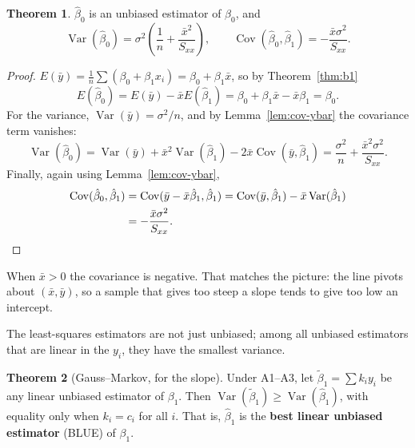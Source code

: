 \documentclass[11pt,a4paper]{article}
\numberwithin{equation}{section}
\theoremstyle{definition}
\newtheorem{thm}{Theorem}[subsection]
\begin{document}
\begin{thm}\label{thm:b0}
$\hat\beta_0$ is an unbiased estimator of $\beta_0$, and
\[
\operatorname{Var}(\hat\beta_0) = \sigma^2 \left( \frac1n + \frac{\bar x^2}{S_{xx}} \right),
\qquad
\operatorname{Cov}(\hat\beta_0, \hat\beta_1) = -\frac{\bar x \sigma^2}{S_{xx}} .
\]
\end{thm}

\begin{proof}
$E(\bar y) = \frac1n \sum (\beta_0 + \beta_1 x_i) = \beta_0 + \beta_1 \bar x$, so by
Theorem~\ref{thm:b1}
\[
E(\hat\beta_0) = E(\bar y) - \bar x E(\hat\beta_1) = \beta_0 + \beta_1 \bar x - \bar x \beta_1 = \beta_0 .
\]
For the variance, $\operatorname{Var}(\bar y) = \sigma^2/n$, and by Lemma~\ref{lem:cov-ybar}
the covariance term vanishes:
\[
\operatorname{Var}(\hat\beta_0) = \operatorname{Var}(\bar y) + \bar x^2 \operatorname{Var}(\hat\beta_1)
- 2\bar x \operatorname{Cov}(\bar y, \hat\beta_1)
= \frac{\sigma^2}{n} + \frac{\bar x^2 \sigma^2}{S_{xx}} .
\]
Finally, again using Lemma~\ref{lem:cov-ybar},
\begin{align*}
\operatorname{Cov}(\hat\beta_0, \hat\beta_1) &= \operatorname{Cov}(\bar y - \bar x \hat\beta_1, \hat\beta_1)
  = \operatorname{Cov}(\bar y, \hat\beta_1) - \bar x \operatorname{Var}(\hat\beta_1) \\
  &= -\frac{\bar x \sigma^2}{S_{xx}} . \qedhere
\end{align*}
\end{proof}

When $\bar x > 0$ the covariance is negative. That matches the picture: the line pivots about
$(\bar x, \bar y)$, so a sample that gives too steep a slope tends to give too low an
intercept.

The least-squares estimators are not just unbiased; among all unbiased estimators that are
linear in the $y_i$, they have the smallest variance.

\begin{thm}[Gauss--Markov, for the slope]\label{thm:gauss-markov}
Under A1--A3, let $\tilde\beta_1 = \sum k_i y_i$ be any linear unbiased estimator of
$\beta_1$. Then $\operatorname{Var}(\tilde\beta_1) \ge \operatorname{Var}(\hat\beta_1)$, with
equality only when $k_i = c_i$ for all $i$. That is, $\hat\beta_1$ is the \textbf{best
linear unbiased estimator} (BLUE) of $\beta_1$.
\end{thm}
\end{document}
